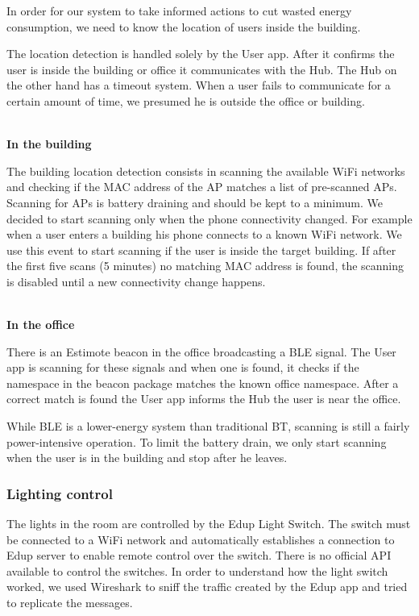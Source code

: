\documentclass[conference]{IEEEtran}
\begin{document}
In order for our system to take informed actions to cut wasted energy consumption, we need to know the location of users inside the building.


The location detection is handled solely by the User app. After it confirms the user is inside the building or office it communicates with the Hub. The Hub on the other hand has a timeout system. When a user fails to communicate for a certain amount of time, we presumed he is outside the office or building.

\mbox{}\\
\textbf{In the building}

The building location detection consists in scanning the available \ac{WiFi} networks and checking if the \ac{MAC} address of the \ac{AP} matches a list of pre-scanned \ac{AP}s. Scanning for \ac{AP}s is battery draining and should be kept to a minimum. We decided to start scanning only when the phone connectivity changed. For example when a user enters a building his phone connects to a known \ac{WiFi} network. We use this event to start scanning if the user is inside the target building. If after the first five scans (5 minutes) no matching \ac{MAC} address is found, the scanning is disabled until a new connectivity change happens. 

\mbox{}\\
\textbf{In the office}

There is an Estimote beacon in the office broadcasting a \ac{BLE} signal. The User app is scanning for these signals and when one is found, it checks if the namespace in the beacon package matches the known office namespace. After a correct match is found the User app informs the Hub the user is near the office.

While \ac{BLE} is a lower-energy system than traditional \ac{BT}, scanning is still a fairly power-intensive operation. To limit the battery drain, we only start scanning when the user is in the building and stop after he leaves.

\subsubsection{Lighting control}\label{light_imp}


The lights in the room are controlled by the Edup Light Switch. The switch must be connected to a WiFi network and automatically establishes a connection to Edup server to enable remote control over the switch. There is no official \ac{API} available to control the switches. In order to understand how the light switch worked, we used Wireshark to sniff the traffic created by the Edup app and tried to replicate the messages.
\end{document}
